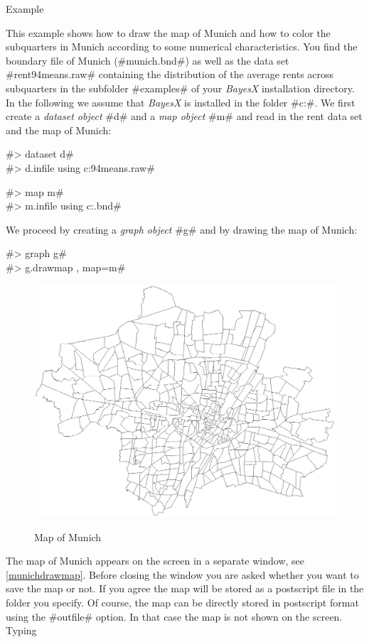 \begin{stanza}{Example}

This example shows how to draw the map of Munich and how to color
the subquarters in Munich according to some numerical
characteristics. You find the boundary file of Munich (#munich.bnd#)
as well as the data set #rent94means.raw# containing the
distribution of the average rents across subquarters in the
subfolder #examples# of your {\em BayesX} installation directory. In
the following we assume that {\em BayesX} is installed in the folder
#c:\bayesx#. We first create a {\em dataset object} #d# and a {\em
map object} #m# and read in the rent data set and the map of Munich:

#> dataset d# \\
#> d.infile using c:\bayesx\examples\rent94means.raw#

#> map m# \\
#> m.infile using c:\bayesx\examples\munich.bnd#

We proceed by creating a {\em graph object} #g# and by drawing the map of Munich:

#> graph g# \\
#> g.drawmap , map=m#

\begin{figure}[htb]
\begin{center}
\includegraphics[scale=0.5]{grafiken/munichdrawmap.ps}
{\em\caption{ \label{munichdrawmap} Map of Munich}}
\end{center}
\end{figure}

The map of Munich appears on the screen in a separate window, see
\autoref{munichdrawmap}. Before closing the window you are asked
whether you want to save the map or not. If you agree the map will
be stored as a postscript file in the folder you specify. Of
course, the map can be directly stored in postscript format using
the #outfile# option. In that case the map is not shown on the
screen. Typing


\end{stanza}
